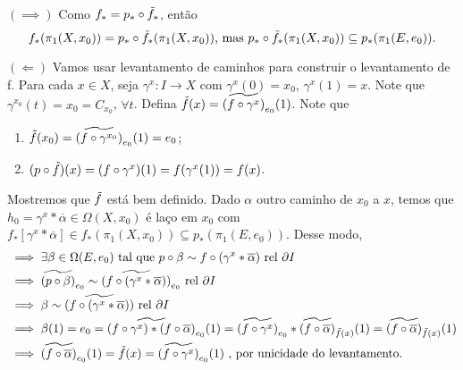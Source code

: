 \begin{dem}
    $(\implies)$ Como $f_{*} = p_{*} \circ \Tilde{f}_{*}$, então 
    $$ f_{*}(\pi_{1}(X, x_0)) = p_{*} \circ \Tilde{f}_{*}(\pi_{1}(X, x_0)) \text{, mas   } p_{*} \circ \Tilde{f}_{*}(\pi_{1}(X, x_0)) \subseteq p_{*}(\pi_{1}(E, e_0)).$$

    $(\Longleftarrow)$ Vamos usar levantamento de caminhos para construir o levantamento de f. Para cada $x \in X$, seja $\gamma^{x} : I \rightarrow X$ com $\gamma^{x} (0) = x_0$, $\gamma^{x}(1) = x$. Note que $\gamma^{x_0}(t) = x_0 = C_{x_0}$, $\forall t$. Defina $\Tilde{f}(x) = \widetilde{(f \circ \gamma^{x})}_{e_0} (1)$. Note que 
    


    \begin{enumerate}
        \item $\Tilde{f}(x_0) = \widetilde{(f \circ \gamma^{x_0})}_{e_0}(1) = e_0$;
        \item $(p \circ \Tilde{f})(x) = (f \circ \gamma^{x})(1) = f(\gamma^{x}(1)) = f(x)$.
    \end{enumerate}

    Mostremos que $\Tilde{f}$ está bem definido. Dado $\alpha$ outro caminho de $x_0$ a $x$, temos que $h_0 = \gamma^{x} \ast \overline{\alpha} \in \Omega(X, x_0)$ é laço em $x_0$ com $f_{*}[ \gamma^{x} \ast \overline{\alpha}] \in f_{*}(\pi_{1}(X, x_0)) \subseteq p_{*}(\pi_{1}(E, e_0))$. Desse modo,
    \begin{align*}
        &\implies \exists \beta \in \Omega(E, e_0) \text{ tal que } p \circ \beta \sim f \circ (\gamma^{x} \ast \overline{\alpha}) \text{ rel } \partial I \\
        &\implies \widetilde{(p \circ \beta)}_{e_0} \sim \widetilde{(f \circ (\gamma^{x} \ast \overline{\alpha}))}_{e_0} \text{ rel } \partial I \\
        &\implies \beta \sim \widetilde{(f \circ (\gamma^{x} \ast \overline{\alpha}))} \text{ rel } \partial I \\
        &\implies \beta(1) = e_0 = \widetilde{(f\circ\gamma^{x}) \ast (f \circ \overline{\alpha})}_{e_0}(1) = \widetilde{(f\circ\gamma^{x})}_{e_0} \ast \widetilde{(f \circ \overline{\alpha})}_{\Tilde{f}(x)} (1) = \widetilde{(f \circ \overline{\alpha})}_{\Tilde{f}(x)} (1) \\
        &\implies \widetilde{(f \circ \overline{\alpha})}_{e_0}(1) = \Tilde{f}(x) = \widetilde{(f \circ \gamma^{x})}_{e_0} (1) \text{ , por unicidade do levantamento.}
    \end{align*}


\end{dem}
